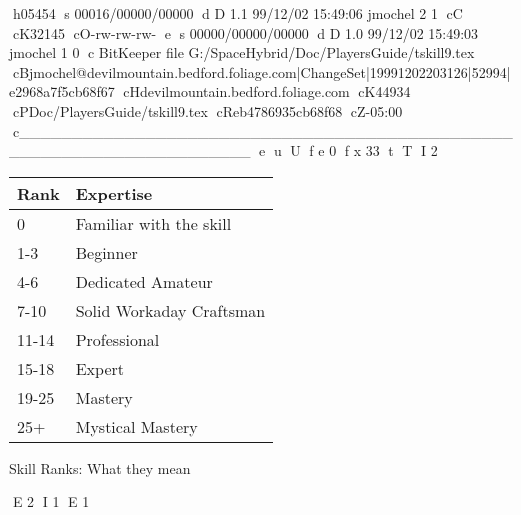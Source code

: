 h05454
s 00016/00000/00000
d D 1.1 99/12/02 15:49:06 jmochel 2 1
cC
cK32145
cO-rw-rw-rw-
e
s 00000/00000/00000
d D 1.0 99/12/02 15:49:03 jmochel 1 0
c BitKeeper file G:/SpaceHybrid/Doc/PlayersGuide/tskill9.tex
cBjmochel@devilmountain.bedford.foliage.com|ChangeSet|19991202203126|52994|e2968a7f5cb68f67
cHdevilmountain.bedford.foliage.com
cK44934
cPDoc/PlayersGuide/tskill9.tex
cReb4786935cb68f68
cZ-05:00
c______________________________________________________________________
e
u
U
f e 0
f x 33
t
T
I 2
\begin{SHTable}
	\begin{tabular}{ll}
    Rank & Expertise \\
\hline
	0           & Familiar with the skill \\
	1-3         & Beginner \\
	4-6         & Dedicated Amateur \\
	7-10        & Solid Workaday Craftsman \\
	11-14       & Professional \\
	15-18       & Expert \\
	19-25       & Mastery \\
	25+         & Mystical Mastery \\
	\end{tabular}
    \caption{Skill Ranks: What they mean}\label{Table:SkillRanks}
\end{SHTable}

E 2
I 1
E 1
